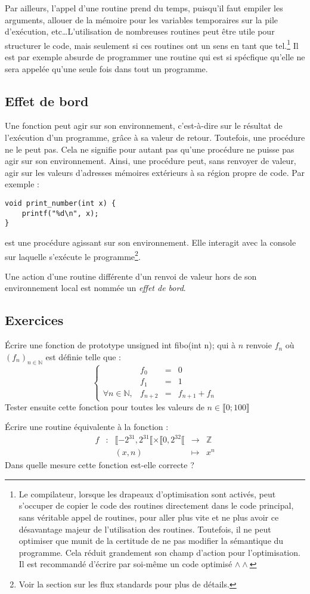 \documentclass[../../../main.tex]{subfiles}
\begin{document}
Par ailleurs, l'appel d'une routine prend du temps, puisqu'il faut empiler les arguments, allouer de la mémoire pour les variables temporaires sur la pile d'exécution, etc\dots L'utilisation de nombreuses routines peut être utile pour structurer le code, mais seulement si ces routines ont un sens en tant que tel.\footnote{Le compilateur, lorsque les drapeaux d'optimisation sont activés, peut s'occuper de copier le code des routines directement dans le code principal, sans véritable appel de routines, pour aller plus vite et ne plus avoir ce désavantage majeur de l'utilisation des routines. Toutefois, il ne peut optimiser que munit de la certitude de ne pas modifier la sémantique du programme. Cela réduit grandement son champ d'action pour l'optimisation. Il est recommandé d'écrire par soi-même un code optimisé $\wedge\wedge$} Il est par exemple absurde de programmer une routine qui est si spécfique qu'elle ne sera appelée qu'une seule fois dans tout un programme.
\subsection{Effet de bord}
Une fonction peut agir sur son environnement, c'est-à-dire sur le résultat de l'exécution d'un programme, grâce à sa valeur de retour. Toutefois, une procédure ne le peut pas. Cela ne signifie pour autant pas qu'une procédure ne puisse pas agir sur son environnement. Ainsi, une procédure peut, sans renvoyer de valeur, agir sur les valeurs d'adresses mémoires extérieurs à sa région propre de code. Par exemple :
\begin{verbatim}
void print_number(int x) {
	printf("%d\n", x);
}
\end{verbatim}
est une procédure agissant sur son environnement. Elle interagit avec la console sur laquelle s'exécute le programme\footnote{Voir la section sur les flux standards pour plus de détails.}.

Une action d'une routine différente d'un renvoi de valeur hors de son environnement local est nommée un \textit{effet de bord}.
\subsection{Exercices}
\newline Écrire une fonction de prototype \textsf{unsigned int fibo(int n);} qui à $n$ renvoie $f_{n}$ où $(f_{n})_{n\in{\mathbb{N}}}$ est définie telle que :
 $$
\left\{\begin{array}{llcl}
& f_{0} & = & 0 \\
& f_{1} & = & 1 \\
\forall{n\in{\mathbb{N}}}, & f_{n+2} & = & f_{n+1} + f_{n}
\end{array}\right.
$$
Tester ensuite cette fonction pour toutes les valeurs de $n\in{\llbracket 0; 100\rrbracket}$
 
 Écrire une routine équivalente à la fonction :
 $$
 \begin{array}{lclcl}
f & : & \llbracket-2^{31}, 2^{31}\llbracket\times{\llbracket0, 2^{32}\llbracket}& \rightarrow & \mathbb{Z} \\
& & (x, n) & \mapsto & x^{n}
\end{array}
$$
Dans quelle mesure cette fonction est-elle correcte ?
\end{document}
